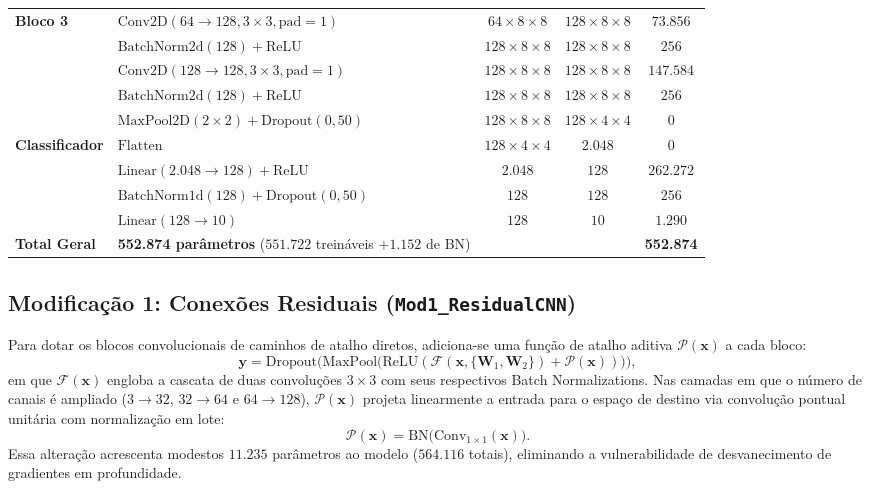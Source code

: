 \documentclass[runningheads]{llncs}
\begin{document}
\begin{table}[H]
\begin{tabular}{llccc}
\midrule
\textbf{Bloco 3} & $\text{Conv2D}(64 \to 128, 3 \times 3, \text{pad}=1)$ & $64 \times 8 \times 8$ & $128 \times 8 \times 8$ & $73.856$ \\
& $\text{BatchNorm2d}(128) + \text{ReLU}$ & $128 \times 8 \times 8$ & $128 \times 8 \times 8$ & $256$ \\
& $\text{Conv2D}(128 \to 128, 3 \times 3, \text{pad}=1)$ & $128 \times 8 \times 8$ & $128 \times 8 \times 8$ & $147.584$ \\
& $\text{BatchNorm2d}(128) + \text{ReLU}$ & $128 \times 8 \times 8$ & $128 \times 8 \times 8$ & $256$ \\
& $\text{MaxPool2D}(2 \times 2) + \text{Dropout}(0{,}50)$ & $128 \times 8 \times 8$ & $128 \times 4 \times 4$ & $0$ \\
\midrule
\textbf{Classificador} & $\text{Flatten}$ & $128 \times 4 \times 4$ & $2.048$ & $0$ \\
& $\text{Linear}(2.048 \to 128) + \text{ReLU}$ & $2.048$ & $128$ & $262.272$ \\
& $\text{BatchNorm1d}(128) + \text{Dropout}(0{,}50)$ & $128$ & $128$ & $256$ \\
& $\text{Linear}(128 \to 10)$ & $128$ & $10$ & $1.290$ \\
\midrule
\textbf{Total Geral} & \textbf{552.874 par\^{a}metros} ($551.722$ trein\'{a}veis $+ 1.152$ de BN) & & & \textbf{552.874} \\
\bottomrule
\end{tabular}
\end{table}

\subsection{Modifica\c{c}\~{a}o 1: Conex\~{o}es Residuais (\texttt{Mod1\_ResidualCNN})}
Para dotar os blocos convolucionais de caminhos de atalho diretos, adiciona-se uma fun\c{c}\~{a}o de atalho aditiva $\mathcal{P}(\mathbf{x})$ a cada bloco:
\begin{equation}
    \mathbf{y} = \text{Dropout}\Big(\text{MaxPool}\big(\text{ReLU}(\mathcal{F}(\mathbf{x}, \{\mathbf{W}_1, \mathbf{W}_2\}) + \mathcal{P}(\mathbf{x}))\big)\Big),
    \label{eq:res_formula}
\end{equation}
em que $\mathcal{F}(\mathbf{x})$ engloba a cascata de duas convolu\c{c}\~{o}es $3 \times 3$ com seus respectivos Batch Normalizations. Nas camadas em que o n\'{u}mero de canais \'{e} ampliado ($3 \to 32$, $32 \to 64$ e $64 \to 128$), $\mathcal{P}(\mathbf{x})$ projeta linearmente a entrada para o espa\c{c}o de destino via convolu\c{c}\~{a}o pontual unit\'{a}ria com normaliza\c{c}\~{a}o em lote:
\begin{equation}
    \mathcal{P}(\mathbf{x}) = \text{BN}\big(\text{Conv}_{1 \times 1}(\mathbf{x})\big).
\end{equation}
Essa altera\c{c}\~{a}o acrescenta modestos $11.235$ par\^{a}metros ao modelo ($564.116$ totais), eliminando a vulnerabilidade de desvanecimento de gradientes em profundidade.
\end{document}
